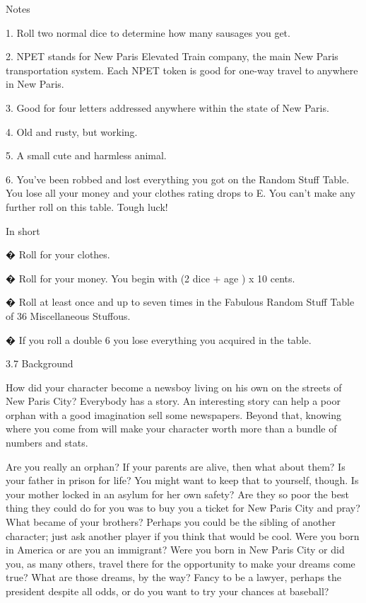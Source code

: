 Notes


1. Roll two normal dice to determine how many sausages you get.


2. NPET stands for New Paris Elevated Train company, the main New Paris transportation system. Each NPET token is good for one-way travel to anywhere in New Paris. 


3. Good for four letters addressed anywhere within the state of New Paris.


4. Old and rusty, but working. 


5. A small cute and harmless animal.


6. You've been robbed and lost everything you got on the Random Stuff Table. You lose all your money and your clothes rating drops to E. You can't make any further roll on this table. Tough luck!


In short


� Roll for your clothes.


� Roll for your money. You begin with (2 dice + age ) x 10 cents.


� Roll at least once and up to seven times in the Fabulous Random Stuff Table of 36 Miscellaneous Stuffous.


� If you roll a double 6 you lose everything you acquired in the table.


3.7 Background


How did your character become a newsboy living on his own on the streets of New Paris City? Everybody has a story. An interesting story can help a poor orphan with a good imagination sell some newspapers. Beyond that, knowing where you come from will make your character worth more than a bundle of numbers and stats.


Are you really an orphan? If your parents are alive, then what about them? Is your father in prison for life? You might want to keep that to yourself, though. Is your mother locked in an asylum for her own safety? Are they so poor the best thing they could do for you was to buy you a ticket for New Paris City and pray? What became of your brothers? Perhaps you could be the sibling of another character; just ask another player if you think that would be cool. Were you born in America or are you an immigrant? Were you born in New Paris City or did you, as many others, travel there for the opportunity to make your dreams come true? What are those dreams, by the way? Fancy to be a lawyer, perhaps the president despite all odds, or do you want to try your chances at baseball?


